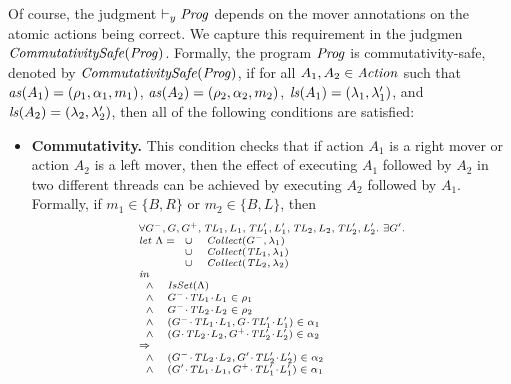 Of course, the judgment $\vdash_y \mathit{Prog}$ depends on the mover annotations on the atomic actions being correct.
We capture this requirement in the judgmen $\mathit{CommutativitySafe}(\mathit{Prog})$.
Formally, the program $\mathit{Prog}$ is commutativity-safe, denoted by $\mathit{CommutativitySafe}(\mathit{Prog})$,
if for all $A_1,A_2 \in \mathit{Action}$ such that $\mathit{as}(A_1) = (\rho_1,\alpha_1,m_1)$, $\mathit{as}(A_2) = (\rho_2,\alpha_2,m_2)$,
$\mathit{ls}(A_1) = (\lambda_1,\lambda'_1)$, and $\mathit{ls}(A_2) = (\lambda_2,\lambda'_2)$, 
then all of the following conditions are satisfied:
\begin{itemize}
\item {\bf Commutativity.}
This condition checks that if action $A_1$ is a right mover or action $A_2$ is a left mover,
then the effect of executing $A_1$ followed by $A_2$ in two different threads can be achieved by executing $A_2$ followed by $A_1$.
Formally, if $m_1 \in \{B,R\}$ or $m_2 \in \{B,L\}$, then 
\[
\scriptsize{
\begin{array}{l}
\forall \varsG^-,\varsG,\varsG^+,\varsTL_1,\varsL_1,\varsTL'_1,\varsL'_1,\varsTL_2,\varsL_2,\varsTL'_2,\varsL'_2.\ \exists \varsG'. \\
\mathit{let}\ \Lambda =
\begin{array}[t]{ll}
\cup & \Collect(\varsG^-, \lins_1) \\
\cup & \Collect(\varsTL_1, \lins_1) \\
\cup & \Collect(\varsTL_2, \lins_2) 
\end{array} \\
\mathit{in} \\
\begin{array}{ll}
\wedge & \IsSet(\Lambda) \\
\wedge & \MakeStore{\varsG^-}{\varsTL_1}{\varsL_1} \in \rho_1 \\
\wedge & \MakeStore{\varsG^-}{\varsTL_2}{\varsL_2} \in \rho_2 \\
\wedge & (\MakeStore{\varsG^-}{\varsTL_1}{\varsL_1},\MakeStore{\varsG}{\varsTL'_1}{\varsL'_1}) \in \alpha_1 \\
\wedge & (\MakeStore{\varsG}{\varsTL_2}{\varsL_2},\MakeStore{\varsG^+}{\varsTL'_2}{\varsL'_2}) \in \alpha_2 \\
\end{array} \\
\Rightarrow \\
\begin{array}{ll}
\wedge & (\MakeStore{\varsG^-}{\varsTL_2}{\varsL_2},\MakeStore{\varsG'}{\varsTL'_2}{\varsL'_2}) \in \alpha_2 \\
\wedge & (\MakeStore{\varsG'}{\varsTL_1}{\varsL_1},\MakeStore{\varsG^+}{\varsTL'_1}{\varsL'_1}) \in \alpha_1 \\
\end{array}
\end{array}
}
\]


\end{itemize}

